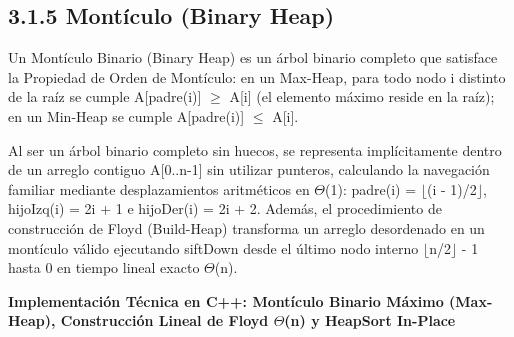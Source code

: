 \documentclass[11pt,letterpaper]{article}
\begin{document}
\subsection*{3.1.5 Montículo (Binary Heap)}
Un Montículo Binario (Binary Heap) es un árbol binario completo que satisface la Propiedad de Orden de Montículo: en un Max-Heap, para todo nodo i distinto de la raíz se cumple A[padre(i)] $\ge$ A[i] (el elemento máximo reside en la raíz); en un Min-Heap se cumple A[padre(i)] $\le$ A[i].\par
Al ser un árbol binario completo sin huecos, se representa implícitamente dentro de un arreglo contiguo A[0..n-1] sin utilizar punteros, calculando la navegación familiar mediante desplazamientos aritméticos en $\Theta$(1): padre(i) = $\lfloor$(i - 1)/2$\rfloor$, hijoIzq(i) = 2i + 1 e hijoDer(i) = 2i + 2. Además, el procedimiento de construcción de Floyd (Build-Heap) transforma un arreglo desordenado en un montículo válido ejecutando siftDown desde el último nodo interno $\lfloor$n/2$\rfloor$ - 1 hasta 0 en tiempo lineal exacto $\Theta$(n).\par
\vspace{4pt}\noindent\textbf{\color{ipnblue}Implementación Técnica en C++: Montículo Binario Máximo (Max-Heap), Construcción Lineal de Floyd $\Theta$(n) y HeapSort In-Place}\par\vspace{-2pt}
\end{document}
